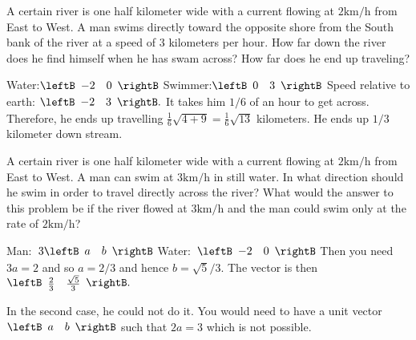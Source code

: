 \begin{enumialphparenastyle}
\begin{ex} A certain river is one half kilometer wide with a current flowing at $2\textrm{km}/\textrm{h}$ from East to West. A man swims directly toward the
opposite shore from the South bank of the river at a speed of $3$ kilometers
per hour. How far down the river does he find himself when he has swam
across? How far does he end up traveling? \vspace{1mm}
\begin{sol}
Water:$\leftB \begin{array}{rr}
-2 & 0
\end{array}
\rightB $ 
Swimmer:$\leftB \begin{array}{rr}
0 & 3
\end{array}
\rightB $ 
Speed relative to earth: $\leftB
\begin{array}{rr}
 -2 & 3
\end{array}
\rightB .$ 
It takes him $1/6$ of an hour to get across. Therefore, he ends up travelling $\frac{1}{6}\sqrt{4+9}= \frac{1}{6}\sqrt{13}$ kilometers. He ends up $1/3$ kilometer
down stream.
\end{sol}
\end{ex}

\begin{ex} A certain river is one half kilometer wide with a current flowing at $2\textrm{km}/\textrm{h}$ from East to West. A man can swim at $3\textrm{km}/\textrm{h}$ in
still water. In what direction should he swim in order to travel directly
across the river? What would the answer to this problem be if the river
flowed at $3\textrm{km}/\textrm{h}$ and the man could swim only at the rate of $2\textrm{km}/\textrm{h}$? \vspace{1mm}
\begin{sol}
Man:\ $3\leftB \begin{array}{rr}
 a & b
\end{array}
\rightB $ 
Water:\ $\leftB \begin{array}{rr}
-2 & 0
\end{array}
\rightB $
Then you need $3a=2$ and so $a=2/3$ and hence $b=\sqrt{5}/3$. The vector is
then $\leftB \begin{array}{cc}
 \frac{2}{3} & \frac{\sqrt{5}}{3}
\end{array}
\rightB .$ 

In the second case, he
could not do it. You would need to have a unit vector $\leftB \begin{array}{rr} a & b
\end{array}
\rightB $
such that $2a=3$ which is not possible. 
\end{sol}
\end{ex}



\end{enumialphparenastyle}
